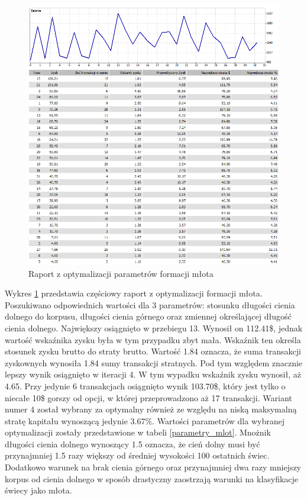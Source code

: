 \documentclass[pdflatex,11pt]{aghdpl}
\begin{document}
\begin{figure}[h!]
\begin{center}
\includegraphics[width=14cm]{hammer/optymalizacja.png}
\caption{Raport z optymalizacji parametrów formacji młota}
\label{opt_mlot}
\end{center}
\end{figure} 
Wykres \ref{opt_mlot} przedstawia częściowy raport z optymalizacji formacji młota. Poszukiwano odpowiednich wartości dla 3 parametrów: stosunku długości cienia dolnego do korpusu, długości cienia górnego oraz zmiennej określającej długość cienia dolnego. Największy osiągnięto w przebiegu 13. Wynosił on 112.41\$, jednak wartość wskaźnika zysku była w tym przypadku zbyt mała. Wskaźnik ten określa stosunek zysku brutto do straty brutto. Wartość 1.84 oznacza, że suma transakcji zyskownych wynosiła 1.84 sumy transakcji stratnych. Pod tym względem znacznie lepszy wynik osiągnięto w iteracji 4. W tym wypadku wskaźnik zysku wynosił, aż 4.65. Przy jedynie 6 transakcjach osiągnięto wynik 103.70\$, który jest tylko o niecałe 10\$ gorszy od opcji, w której przeprowadzono aż 17 transakcji. Wariant numer 4 został wybrany za optymalny również ze względu na niską maksymalną stratę kapitału wynoszącą jedynie 3.67\%. Wartości parametrów dla wybranej optymalizacji zostały przedstawione w tabeli \ref{parametry_mlot}. Mnożnik długości cienia dolnego wynoszący 1.5 oznacza, że cień dolny musi być przynajmniej 1.5 razy większy od średniej wysokości 100 ostatnich świec. Dodatkowo warunek na brak cienia górnego oraz przynajmniej dwa razy mniejszy korpus od cienia dolnego w sposób drastyczny zaostrzają warunki na klasyfikacje świecy jako młota. 
\end{document}
